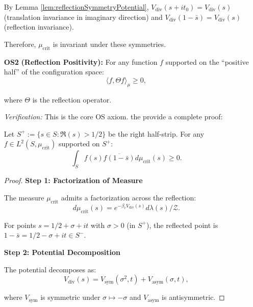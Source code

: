 \begin{theorem}
\begin{enumerate}
By Lemma \ref{lem:reflectionSymmetryPotential}, $V_{\mathrm{div}}(s + it_0) =
V_{\mathrm{div}}(s)$ (translation invariance in imaginary direction) and
$V_{\mathrm{div}}(1 - \bar{s}) = V_{\mathrm{div}}(s)$ (reflection invariance).

Therefore, $\mu_{\mathrm{crit}}$ is invariant under these symmetries.

\item[\textbf{OS2}] \textbf{(Reflection Positivity):} For any function $f$ supported
on the ``positive half'' of the configuration space:
\begin{equation}
\langle f, \Theta f \rangle_{\mu} \geq 0,
\end{equation}

where $\Theta$ is the reflection operator.

\textit{Verification:} This is the core OS axiom. the provide a complete proof:

\begin{lemma}
\label{lem:reflectionPositivityComplete}

Let $S^+ := \{s \in S : \Re(s) > 1/2\}$ be the right half-strip.
For any $f \in L^2(S, \mu_{\mathrm{crit}})$ supported on $S^+$:
\begin{equation}
\int_S f(s) \overline{f(1 - \bar{s})} d\mu_{\mathrm{crit}}(s) \geq 0.
\end{equation}

\begin{proof}

\textbf{Step 1: Factorization of Measure}

The measure $\mu_{\mathrm{crit}}$ admits a factorization across the reflection:
\begin{equation}
d\mu_{\mathrm{crit}}(s) = e^{-\beta_c V_{\mathrm{div}}(s)} d\lambda(s) / \mathcal{Z}.
\end{equation}

For points $s = 1/2 + \sigma + it$ with $\sigma > 0$ (in $S^+$), the reflected
point is $1 - \bar{s} = 1/2 - \sigma + it \in S^-$.

\textbf{Step 2: Potential Decomposition}

The potential decomposes as:
\begin{equation}
V_{\mathrm{div}}(s) = V_{\mathrm{sym}}(\sigma^2, t) + V_{\mathrm{asym}}(\sigma, t),
\end{equation}

where $V_{\mathrm{sym}}$ is symmetric under $\sigma \mapsto -\sigma$ and
$V_{\mathrm{asym}}$ is antisymmetric.


\end{proof}
\end{lemma}
\end{enumerate}
\end{theorem}

